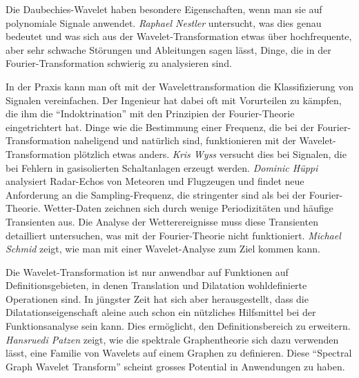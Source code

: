 Die Daubechies-Wavelet haben besondere Eigenschaften, wenn man sie
auf polynomiale Signale anwendet.
{\em Raphael Nestler} untersucht, was dies genau bedeutet und was
sich aus der Wavelet-Transformation etwas über hochfrequente, aber sehr
schwache Störungen und Ableitungen sagen lässt, Dinge, die in der
Fourier-Transformation schwierig zu analysieren sind.

In der Praxis kann man oft mit der Wavelettransformation die
Klassifizierung von Signalen vereinfachen.
Der Ingenieur hat dabei oft mit Vorurteilen zu kämpfen, die ihm die
``Indoktrination'' mit den Prinzipien der Fourier-Theorie eingetrichtert hat.
Dinge wie die Bestimmung einer Frequenz, die bei der Fourier-Transformation
naheligend und natürlich sind, funktionieren mit der Wavelet-Transformation
plötzlich etwas anders.
{\em Kris Wyss} versucht dies bei Signalen, die bei Fehlern in gasisolierten
Schaltanlagen erzeugt werden.
{\em Dominic Hüppi} analysiert Radar-Echos von Meteoren und Flugzeugen
und findet neue Anforderung an die Sampling-Frequenz, die stringenter sind
als bei der Fourier-Theorie.
Wetter-Daten zeichnen sich durch wenige Periodizitäten und häufige
Transienten aus.
Die Analyse der Wetterereignisse muss diese Transienten detailliert
untersuchen, was mit der Fourier-Theorie nicht funktioniert.
{\em Michael Schmid} zeigt, wie man mit einer Wavelet-Analyse zum Ziel
kommen kann.

Die Wavelet-Transformation ist nur anwendbar auf Funktionen auf
Definitionsgebieten, in denen Translation und Dilatation wohldefinierte
Operationen sind.
In jüngster Zeit hat sich aber herausgestellt, dass die Dilatationseigenschaft
aleine auch schon ein nützliches Hilfsmittel bei der Funktionsanalyse sein 
kann.
Dies ermöglicht, den Definitionsbereich zu erweitern.
{\em Hansruedi Patzen} zeigt, wie die spektrale Graphentheorie sich dazu
verwenden lässt, eine Familie von Wavelets auf einem Graphen zu definieren.
Diese ``Spectral Graph Wavelet Transform'' scheint grosses Potential in
Anwendungen zu haben.





